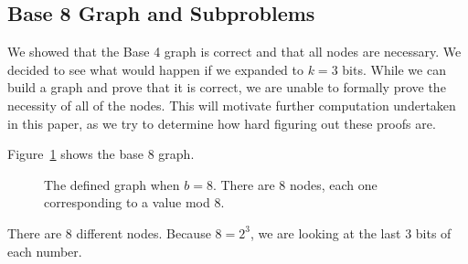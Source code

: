 \documentclass[12pt]{article}
\theoremstyle{definition}
\begin{document}
\subsection{Base 8 Graph and Subproblems} \label{subsec:base8graphsubpblms}
We showed that the Base 4 graph is correct and that all nodes are necessary. We decided to see what would happen if we expanded to $k = 3$ bits. While we can build a graph and prove that it is correct, we are unable to formally prove the necessity of all of the nodes. This will motivate further computation undertaken in this paper, as we try to determine how hard figuring out these proofs are. \par
Figure~\ref{fig:base_8_graph} shows the base 8 graph.
\begin{figure}
    \centering
    \caption{The defined graph when $b = 8$. There are 8 nodes, each one corresponding to a value mod 8.}
    \label{fig:base_8_graph}
\end{figure}
There are 8 different nodes. Because $8 = 2^3$, we are looking at the last 3 bits of each number. 
\end{document}
